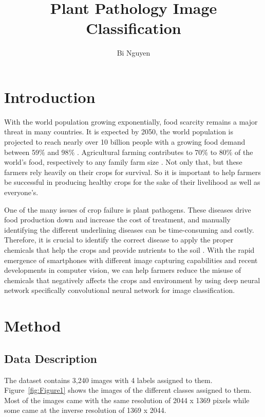 \documentclass[man,floatsintext]{apa7}
\title{Plant Pathology Image Classification}
\author{Bi Nguyen}
\affiliation{University of California - Davis, ECS 171: Machine Learning, Professor Setareh Rafatirad, 5 December 2021}
\begin{document}
\maketitle

\begin{singlespace}
\section{Introduction}
With the world population growing exponentially, food scarcity remains a major threat in many countries. It is expected by 2050, the world population is projected to reach nearly over 10 billion people with a growing food demand between 59$\%$ and 98$\%$ \parencite{elferink}. Agricultural farming contributes to 70$\%$ to 80$\%$ of the world's food, respectively to any family farm size \parencite{ritchie}. Not only that, but these farmers rely heavily on their crops for survival. So it is important to help farmers be successful in producing healthy crops for the sake of their livelihood as well as everyone's.

One of the many issues of crop failure is plant pathogens. These diseases drive food production down and increase the cost of treatment, and manually identifying the different underlining diseases can be time-consuming and costly. Therefore, it is crucial to identify the correct disease to apply the proper chemicals that help the crops and provide nutrients to the soil \parencite{chemicals}. With the rapid emergence of smartphones with different image capturing capabilities and recent developments in computer vision, we can help farmers reduce the misuse of chemicals that negatively affects the crops and environment by using deep neural network specifically convolutional neural network for image classification.


\section{Method}
\subsection{Data Description}
The dataset contains 3,240 images with 4 labels assigned to them. Figure~\ref{fig:Figure1} shows the images of the different classes assigned to them. Most of the images came with the same resolution of 2044 x 1369 pixels while some came at the inverse resolution of 1369 x 2044. 


\end{singlespace}
\end{document}
